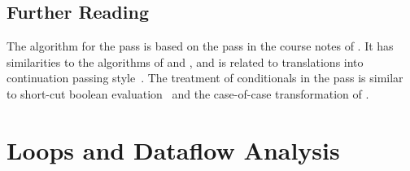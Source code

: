 \documentclass[7x10,nocrop]{TimesAPriori_MIT}%
\begin{document}
\section{Further Reading}
\label{sec:cond-further-reading}

The algorithm for the  pass is based on the
 pass in the course notes of
\citet{Dybvig:2010aa}.
%
It has similarities to the algorithms of \citet{Danvy:2003fk} and
\citet{Appel:2003fk}, and is related to translations into continuation
passing
style~\citep{Wijngaarden:1966,Fischer:1972,reynolds72:_def_interp,Plotkin:1975,Friedman:2001}.
%
The treatment of conditionals in the  pass is
similar to short-cut boolean
evaluation~\citep{Logothetis:1981,Aho:2006wb,Clarke:1989,Danvy:2003fk}
and the case-of-case transformation of \citet{PeytonJones:1998}.

\chapter{Loops and Dataflow Analysis}
\label{ch:Lwhile}


\end{document}
